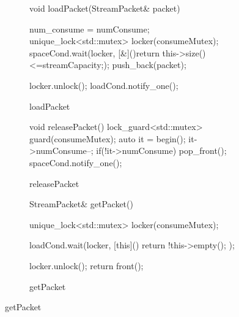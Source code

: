 \begin{figure}[!htp]
  \centering
  \begin{subfigure}{0.32\textwidth}
    \centering
    
\begin{codeblock}[language=C, basicstyle=\ttfamily\tiny]
void loadPacket(StreamPacket& packet) 
{
    num_consume = numConsume;
    unique_lock<std::mutex> locker(consumeMutex);
    spaceCond.wait(locker, [&](){return this->size()<=streamCapacity;});
    push_back(packet);
    
    locker.unlock();
    loadCond.notify_one();
}
\end{codeblock}

    \caption{loadPacket}
  \end{subfigure}
  \begin{subfigure}{0.32\textwidth}
    \centering
    
\begin{codeblock}[language=C, basicstyle=\ttfamily\tiny]
void releasePacket()
{
    {
        lock_guard<std::mutex> guard(consumeMutex);
        auto it = begin();
        it->numConsume--;
        if(!it->numConsume)
            pop_front();
    }
    spaceCond.notify_one();
}
\end{codeblock}

    \caption{releasePacket}
  \end{subfigure}
  \begin{subfigure}{0.32\textwidth}
    \centering
    
\begin{codeblock}[language=C, basicstyle=\ttfamily\tiny]
StreamPacket& getPacket()
{
    unique_lock<std::mutex> locker(consumeMutex);
    
    loadCond.wait(locker, [this](){ 
        return !this->empty();
    });
    
    locker.unlock();
    return front();
}
\end{codeblock}

    \caption{getPacket}
  \end{subfigure}
  
  \label{fig:stream_code}
\end{figure}

